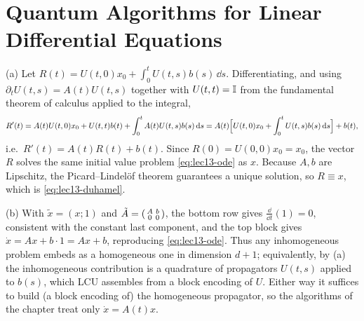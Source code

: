 \chapter{Quantum Algorithms for Linear Differential Equations}

\begin{solution}
(a) Let $R(t)=U(t,0)x_0+\int_0^t U(t,s)b(s)\,\dd s$. Differentiating, and using
$\partial_t U(t,s)=A(t)U(t,s)$ together with $U(t,t)=\mathbb{I}$ from the fundamental theorem of
calculus applied to the integral,
\[
  R'(t)=A(t)U(t,0)x_0+U(t,t)b(t)+\int_0^t A(t)U(t,s)b(s)\,\mathrm{d} s
       =A(t)\Bigl[U(t,0)x_0+\int_0^t U(t,s)b(s)\,\mathrm{d} s\Bigr]+b(t),
\]
i.e.\ $R'(t)=A(t)R(t)+b(t)$. Since $R(0)=U(0,0)x_0=x_0$, the vector $R$ solves the same
initial value problem \eqref{eq:lec13-ode} as $x$. Because $A,b$ are Lipschitz, the
Picard--Lindel\"of theorem guarantees a unique solution, so $R\equiv x$, which is
\eqref{eq:lec13-duhamel}.

(b) With $\tilde x=(x;1)$ and $\tilde A=\begin{psmallmatrix}A&b\\0&0\end{psmallmatrix}$, the
bottom row gives $\tfrac{\dd}{\dd t}(1)=0$, consistent with the constant last component, and the
top block gives $\dot x=Ax+b\cdot1=Ax+b$, reproducing \eqref{eq:lec13-ode}. Thus any
inhomogeneous problem embeds as a homogeneous one in dimension $d+1$; equivalently, by (a) the
inhomogeneous contribution is a quadrature of propagators $U(t,s)$ applied to $b(s)$, which LCU
assembles from a block encoding of $U$. Either way it suffices to build (a block encoding of) the
homogeneous propagator, so the algorithms of the chapter treat only $\dot x=A(t)x$.
\end{solution}

